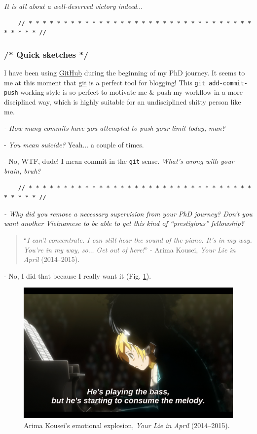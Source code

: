 \documentclass[12pt]{article}
\begin{document}
{\it It is all about a well-deserved victory indeed}$\ldots$

\begin{verbatim}
	// * * * * * * * * * * * * * * * * * * * * * * * * * * * * * * * * * * * * * //
\end{verbatim}

\subsubsection{{\color{gray}/* Quick sketches */}}
 I have been using \href{https://github.com}{GitHub} during the beginning of my PhD journey. It seems to me at this moment that \href{https://git-scm.com/}{git} is a perfect tool for blogging! This {\tt git add-commit-push} working style is so perfect to motivate me \& push my workflow in a more disciplined way, which is highly suitable for an undisciplined shitty person like me.

{\it - How many commits have you attempted to push your limit today, man?}

- {\it You mean suicide?} Yeah$\ldots$ a couple of times.

- No, WTF, dude! I mean commit in the {\tt git} sense. {\it What's wrong with your brain, bruh?}

\begin{verbatim}
	// * * * * * * * * * * * * * * * * * * * * * * * * * * * * * * * * * * * * * //
\end{verbatim}

\noindent
{} {\it - Why did you remove a necessary supervision from your PhD journey? Don't you want another Vietnamese to be able to get this kind of ``prestigious'' fellowship?}

\begin{quote}
	``{\it I can't concentrate. I can still hear the sound of the piano. It's in my way. You're in my way, so$\ldots$ Get out of here!}'' - Arima Kousei, {\it Your Lie in April}  (2014--2015).
\end{quote}

- No, I did that because I really want it (Fig. \ref{fig4}).
\begin{figure}[H]
	\centering
	\includegraphics[width = 15cm]{Arima_Kousei_emotional_explosion}
	\caption{Arima Kousei's emotional explosion, {\it Your Lie in April} (2014--2015).}
	\label{fig4}
\end{figure}
\end{document}
